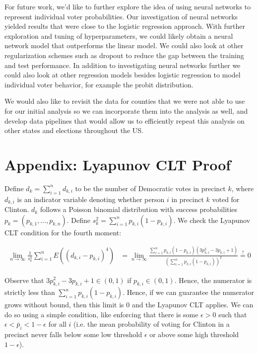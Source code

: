 \documentclass[10pt,twocolumn,letterpaper]{article}
\begin{document}
For future work, we'd like to further explore the idea of using neural networks to represent individual voter probabilities. Our investigation of neural networks yielded results that were close to the logistic regression approach. With further exploration and tuning of hyperparameters, we could likely obtain a neural network model that outperforms the linear model. We could also look at other regularization schemes such as dropout to reduce the gap between the training and test performance. In addition to investigating neural networks further we could also look at other regression models besides logistic regression to model individual voter behavior, for example the probit distribution.

We would also like to revisit the data for counties that we were not able to use for our initial analysis so we can incorporate them into the analysis as well, and develop data pipelines that would allow us to efficiently repeat this analysis on other states and elections throughout the US. 

\newpage
\onecolumn

\section*{Appendix: Lyapunov CLT Proof}

Define $d_k = \sum_{i = 1}^n d_{k, i}$ to be the number of Democratic votes in precinct $k$, where $d_{k, i}$ is an indicator variable denoting whether person $i$ in precinct $k$ voted for Clinton. $d_k$ follows a Poisson binomial distribution with success probabilities $p_k = (p_{k, 1}, \dots, p_{k, n})$. Define $s_{k}^2 = \sum_{i = 1}^{n} p_{k, i} (1-p_{k, i})$. 
We check the Lyapunov CLT \cite{billingsley1995probability} condition for the fourth moment: 

\begin{align*}
\lim_{n \to \infty} \frac{1}{s_k^4} \sum_{i = 1}^n E \left( (d_{k, i} - p_{k, i})^4 \right) &= \lim_{n \to \infty} \frac{\sum_{i = 1}^n p_{k, i}(1-p_{k, i}) \left( 3p_{k, i}^2 - 3p_{k, i} + 1 \right)}{\left(\sum_{i = 1}^n p_{k, i} \left( 1- p_{k, i} \right) \right)^2} \stackrel{?} = 0 
\end{align*}

Observe that $3p_{k, i}^2 - 3p_{k, i} + 1 \in (0, 1)$ if $p_{k, i} \in (0, 1)$. Hence, the numerator is strictly less than $\sum_{i = 1}^n p_{k, i} (1 - p_{k, i})$. Hence, if we can guarantee the numerator grows without bound, then this limit is 0 and the Lyapunov CLT applies. We can do so using a simple condition, like enforcing that there is some $\epsilon > 0$ such that $\epsilon < \bar p_i < 1- \epsilon$ for all $i$ (i.e. the mean probability of voting for Clinton in a precinct never falls below some low threshold $\epsilon$ or above some high threshold $1-\epsilon$). 
\end{document}
